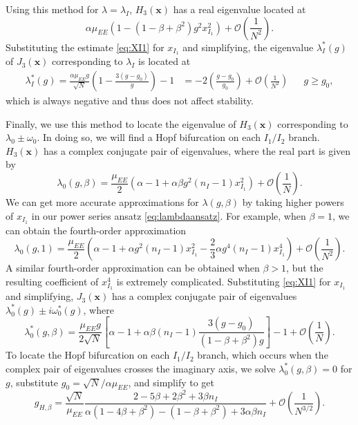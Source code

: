 \documentclass[reqno]{siamonline190516}
\newcommand{\xvec}{\mathbf{x}}
\begin{document}
Using this method for $\lambda = \lambda_I$, $H_3(\xvec)$ has a real eigenvalue located at 
\[
\alpha \mu_{EE} \left(1 - (1-\beta+\beta^2)g^2 x_{I_1}^2 \right) + \mathcal{O}\left(\frac{1}{N^2} \right).
\]
Substituting the estimate \cref{eq:XI1} for $x_{I_1}$ and simplifying, the eigenvalue $\lambda_I^*(g)$ of $J_3(\xvec)$ corresponding to $\lambda_I$ is located at
\begin{align*}
\lambda_I^*(g) = \frac{\alpha \mu_{EE} g}{\sqrt{N}} \left( 1 - \frac{3(g-g_0)}{g}\right) - 1 &= -2\left( \frac{g - g_0}{g_0} \right) + \mathcal{O}\left(\frac{1}{N^2} \right) && g \geq g_0,
\end{align*}
which is always negative and thus does not affect stability.

Finally, we use this method to locate the eigenvalue of $H_3(\xvec)$ corresponding to $\lambda_0 \pm \omega_0$. In doing so, we will find a Hopf bifurcation on each $I_1/I_2$ branch. $H_3(\xvec)$ has a complex conjugate pair of eigenvalues, where the real part is given by
\begin{equation}
\lambda_0(g, \beta) = \frac{\mu_{EE}}{2}\left( \alpha - 1 + \alpha \beta g^2 (n_I-1) x_{I_1}^2 \right) + \mathcal{O}\left(\frac{1}{N} \right).
\end{equation}
We can get more accurate approximations for $\lambda(g, \beta)$ by taking higher powers of $x_{I_1}$ in our power series ansatz \cref{eq:lambdaansatz}. For example, when $\beta=1$, we can obtain the fourth-order approximation
\[
\lambda_0(g, 1) = \frac{\mu_{EE}}{2}\left( \alpha - 1 + \alpha g^2 (n_I-1) x_{I_1}^2 - \frac{2}{3}\alpha g^4 (n_I-1) x_{I_1}^4 \right) + \mathcal{O}\left(\frac{1}{N^2} \right).
\]
A similar fourth-order approximation can be obtained when $\beta>1$, but the resulting coefficient of $x_{I_1}^4$ is extremely complicated.
Substituting \cref{eq:XI1} for $x_{I_1}$ and simplifying, $J_3(\xvec)$ has a complex conjugate pair of eigenvalues $\lambda_0^*(g) \pm i \omega_0^*(g)$, where
\begin{equation}\label{eq:lambdagbeta}
\lambda_0^*(g, \beta) = \frac{\mu_{EE} g}{2 \sqrt{N}}\left[ \alpha - 1 + \alpha \beta (n_I-1) \frac{ 3(g - g_0) }{ (1 - \beta + \beta^2 )g} \right] - 1 + \mathcal{O}\left(\frac{1}{N} \right).
\end{equation}
To locate the Hopf bifurcation on each $I_1/I_2$ branch, which occurs when the complex pair of eigenvalues crosses the imaginary axis, we solve $\lambda_0^*(g, \beta) = 0$ for $g$, substitute $g_0 = \sqrt{N}/\alpha \mu_{EE}$, and simplify to get
\begin{equation}\label{eq:ghopfformula}
    g_{H,\beta} = 
    \frac{\sqrt{N}}{\mu_{EE}} 
    \frac{ 2 - 5\beta + 2 \beta^2 + 3 \beta n_I}
    { \alpha(1 - 4 \beta + \beta^2) - (1 - \beta + \beta^2) + 3 \alpha \beta n_I }
    + \mathcal{O}\left( \frac{1}{N^{3/2}} \right).
\end{equation}
\end{document}
